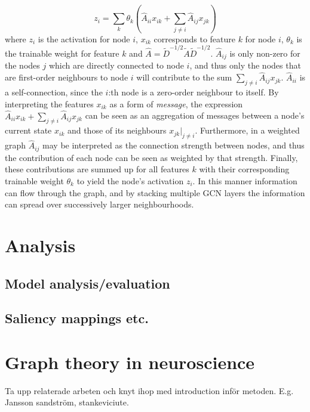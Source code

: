 \begin{equation}
    z_i = \sum_k \theta_k \left(\hat{A}_{ii} x_{ik} + \sum_{j \neq i} \hat{A}_{ij} x_{jk} \right)
\end{equation}
where $z_i$ is the activation for node $i$, $x_{ik}$ corresponds to feature $k$ for node $i$, $\theta_k$ is the trainable weight for feature $k$ and $\hat{A} = \tilde{D}^{-1/2} \tilde{A} \tilde{D}^{-1/2}$. $\hat{A}_{ij}$ is only non-zero for the nodes $j$ which are directly connected to node $i$, and thus only the nodes that are first-order neighbours to node $i$ will contribute to the sum $\sum_{j \neq i} \hat{A}_{ij} x_{jk}$. $\hat{A}_{ii}$ is a self-connection, since the $i$:th node is a zero-order neighbour to itself.
By interpreting the features $x_{ik}$ as a form of \textit{message}, the expression $\hat{A}_{ii} x_{ik} + \sum_{j \neq i} \hat{A}_{ij} x_{jk}$ can be seen as an aggregation of messages between a node's current state $x_{ik}$ and those of its neighbours $x_{jk}\left.\right\rvert_{j\neq i}$. Furthermore, in a weighted graph $\hat{A}_{ij}$ may be interpreted as the connection strength between nodes, and thus the contribution of each node can be seen as weighted by that strength. Finally, these contributions are summed up for all features $k$ with their corresponding trainable weight $\theta_k$ to yield the node's activation $z_i$. In this manner information can flow through the graph, and by stacking multiple GCN layers the information can spread over successively larger neighbourhoods. 






\section{Analysis}
\subsection{Model analysis/evaluation}
\subsection{Saliency mappings etc.}

\section{Graph theory in neuroscience}
Ta upp relaterade arbeten och knyt ihop med introduction inför metoden. E.g. Jansson sandström, stankeviciute.

